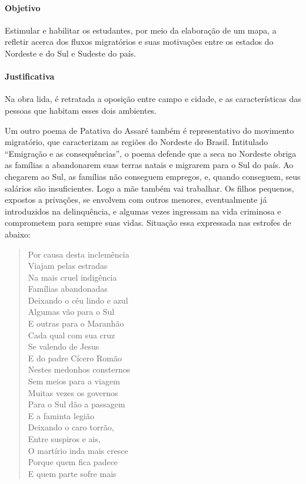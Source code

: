 \documentclass[12pt]{extarticle}
\begin{document}
\paragraph{Objetivo} Estimular e habilitar os estudantes, por meio da 
elaboração de um mapa, a refletir acerca dos fluxos migratórios e suas 
motivações entre os estados do Nordeste e do Sul e Sudeste do país. 

\paragraph{Justificativa} Na obra lida, é retratada a oposição entre campo 
e cidade, e as características das pessoas que habitam esses dois ambientes.

Um outro poema de Patativa do Assaré também é representativo do movimento 
migratório, que caracterizam as regiões do Nordeste do Brasil. Intitulado 
``Emigração e as consequências'', o poema defende que a seca no Nordeste 
obriga as famílias a abandonarem suas terras natais e migrarem para o 
Sul do país. Ao chegarem ao Sul, as famílias não conseguem empregos, e, 
quando conseguem, seus salários são insuficientes. Logo a mãe também vai 
trabalhar. Os filhos pequenos, expostos a privações, se envolvem com 
outros menores, eventualmente já introduzidos na delinquência, e algumas 
vezes ingressam na vida criminosa e comprometem para sempre suas vidas. 
Situação essa expressada nas estrofes de abaixo:

\begin{verse}
Por causa desta inclemência\\
Viajam pelas estradas\\
Na mais cruel indigência\\
Famílias abandonadas\\
Deixando o céu lindo e azul\\
Algumas vão para o Sul\\
E outras para o Maranhão\\
Cada qual com sua cruz\\
Se valendo de Jesus\\
E do padre Cícero Romão\\

Nestes medonhos consternos\\
Sem meios para a viagem\\
Muitas vezes os governos\\
Para o Sul dão a passagem\\
E a faminta legião\\
Deixando o caro torrão,\\
Entre suspiros e ais,\\
O martírio inda mais cresce\\
Porque quem fica padece\\
E quem parte sofre mais\\
\end{verse}
\end{document}
